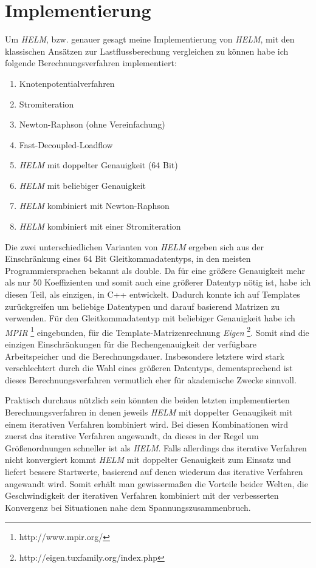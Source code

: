 \documentclass[12pt,a4paper]{article}
\begin{document}
	\section{Implementierung}
	
	Um \emph{HELM}, bzw. genauer gesagt meine Implementierung von \emph{HELM}, mit den klassischen Ansätzen zur Lastflussberechung vergleichen zu können habe ich folgende Berechnungsverfahren implementiert:
	\begin{enumerate}
		\item Knotenpotentialverfahren
		\item Stromiteration
		\item Newton-Raphson (ohne Vereinfachung)
		\item Fast-Decoupled-Loadflow
		\item \emph{HELM} mit doppelter Genauigkeit (64 Bit)
		\item \emph{HELM} mit beliebiger Genauigkeit
		\item \emph{HELM} kombiniert mit Newton-Raphson
		\item \emph{HELM} kombiniert mit einer Stromiteration
	\end{enumerate}
	
	Die zwei unterschiedlichen Varianten von \emph{HELM} ergeben sich aus der Einschränkung eines 64 Bit Gleitkommadatentyps, in den meisten Programmiersprachen bekannt als double. Da für eine größere Genauigkeit mehr als nur 50 Koeffizienten und somit auch eine größerer Datentyp nötig ist, habe ich diesen Teil, als einzigen, in C++ entwickelt. Dadurch konnte ich auf Templates zurückgreifen um beliebige Datentypen und darauf basierend Matrizen zu verwenden. Für den Gleitkommadatentyp mit beliebiger Genauigkeit habe ich \emph{MPIR} \footnote{http://www.mpir.org/} eingebunden, für die Template-Matrizenrechnung \emph{Eigen} \footnote{http://eigen.tuxfamily.org/index.php}. Somit sind die einzigen Einschränkungen für die Rechengenauigkeit der verfügbare Arbeitspeicher und die Berechnungsdauer. Insbesondere letztere wird stark verschlechtert durch die Wahl eines größeren Datentyps, dementsprechend ist dieses Berechnungsverfahren vermutlich eher für akademische Zwecke sinnvoll.
	
	Praktisch durchaus nützlich sein könnten die beiden letzten implementierten Berechnungsverfahren in denen jeweils \emph{HELM} mit doppelter Genaugikeit mit einem iterativen Verfahren kombiniert wird. Bei diesen Kombinationen wird zuerst das iterative Verfahren angewandt, da dieses in der Regel um Größenordnungen schneller ist als \emph{HELM}. Falls allerdings das iterative Verfahren nicht konvergiert kommt \emph{HELM} mit doppelter Genauigkeit zum Einsatz und liefert bessere Startwerte, basierend auf denen wiederum das iterative Verfahren angewandt wird. Somit erhält man gewissermaßen die Vorteile beider Welten, die Geschwindigkeit der iterativen Verfahren kombiniert mit der verbesserten Konvergenz bei Situationen nahe dem Spannungszusammenbruch.
	
\end{document}
